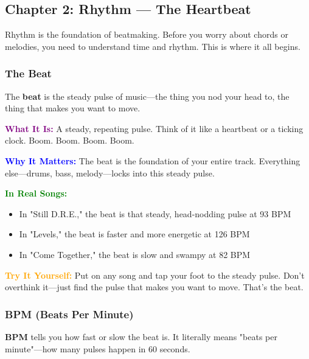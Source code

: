 \documentclass[11pt,letterpaper]{article}
\newcommand{\purple}[1]{\textcolor{purple}{\textbf{#1}}}
\newcommand{\bluepurple}[1]{\textcolor{blue}{\textbf{#1}}}
\newcommand{\greentext}[1]{\textcolor{green}{\textbf{#1}}}
\newcommand{\orangetext}[1]{\textcolor{orange}{\textbf{#1}}}
\begin{document}
\newpage


\subsection{Chapter 2: Rhythm — The Heartbeat}

Rhythm is the foundation of beatmaking. Before you worry about chords or melodies, you need to understand time and rhythm. This is where it all begins.

\subsubsection{The Beat}

The \textbf{beat} is the steady pulse of music—the thing you nod your head to, the thing that makes you want to move.

\textbf{\purple{What It Is:}} A steady, repeating pulse. Think of it like a heartbeat or a ticking clock. Boom. Boom. Boom. Boom.

\textbf{\bluepurple{Why It Matters:}} The beat is the foundation of your entire track. Everything else—drums, bass, melody—locks into this steady pulse.

\textbf{\greentext{In Real Songs:}} 
\begin{itemize}[leftmargin=*]
\item In "Still D.R.E.," the beat is that steady, head-nodding pulse at 93 BPM
\item In "Levels," the beat is faster and more energetic at 126 BPM
\item In "Come Together," the beat is slow and swampy at 82 BPM
\end{itemize}

\textbf{\orangetext{Try It Yourself:}} Put on any song and tap your foot to the steady pulse. Don't overthink it—just find the pulse that makes you want to move. That's the beat.

\subsubsection{BPM (Beats Per Minute)}

\textbf{BPM} tells you how fast or slow the beat is. It literally means "beats per minute"—how many pulses happen in 60 seconds.
\end{document}
